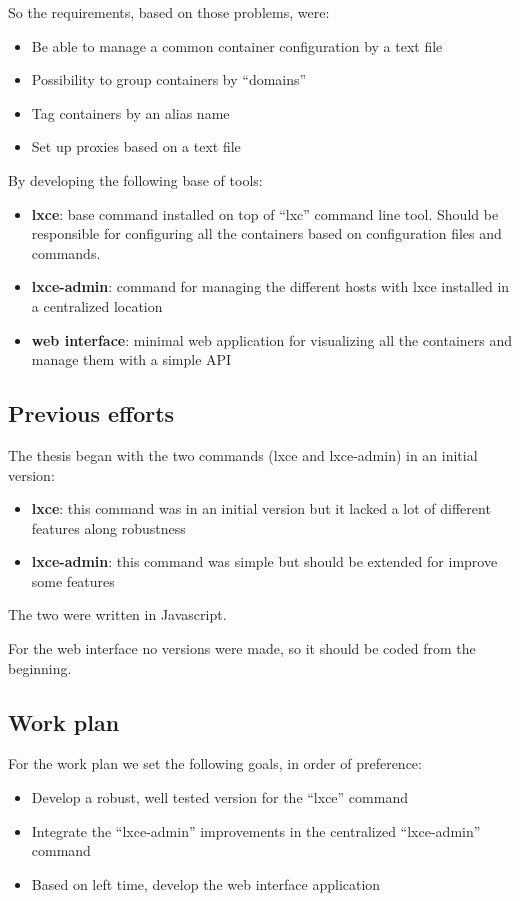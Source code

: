 So the requirements, based on those problems, were:
\begin{itemize}
	\item {Be able to manage a common container configuration by a text file}
	\item {Possibility to group containers by ``domains''}
	\item {Tag containers by an alias name}
	\item {Set up proxies based on a text file}
\end{itemize}

By developing the following base of tools:
\begin{itemize}
	\item {\textbf{lxce}: base command installed on top of ``lxc'' command line tool. Should be responsible for configuring all the containers based on configuration files and commands.}
	\item {\textbf{lxce-admin}: command for managing the different hosts with lxce installed in a centralized location}
	\item {\textbf{web interface}: minimal web application for visualizing all the containers and manage them with a simple API}
\end{itemize}


\subsection{Previous efforts}
\label{ssec:previous}
The thesis began with the two commands (lxce and lxce-admin) in an initial version:
\begin{itemize}
	\item {\textbf{lxce}: this command was in an initial version but it lacked a lot of different features along robustness}
	\item {\textbf{lxce-admin}: this command was simple but should be extended for improve some features}
\end{itemize}
The two were written in Javascript.

For the web interface no versions were made, so it should be coded from the beginning.

\subsection{Work plan}
\label{ssec:gantt}
For the work plan we set the following goals, in order of preference:
\begin{itemize}
	\item {Develop a robust, well tested version for the ``lxce'' command}
	\item {Integrate the ``lxce-admin'' improvements in the centralized ``lxce-admin'' command}
	\item {Based on left time, develop the web interface application}
\end{itemize}

